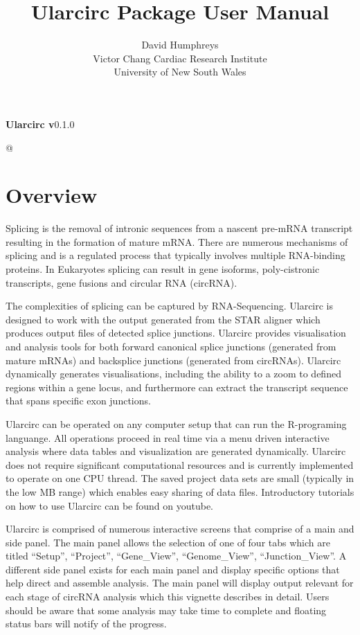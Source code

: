 \documentclass[12pt]{article}\usepackage[]{graphicx}\usepackage[]{color}
\title{Ularcirc Package User Manual}
\author{David Humphreys\\
Victor Chang Cardiac Research Institute\\
University of New South Wales
}
\begin{document}
\maketitle

\begin{center}
\textbf{Ularcirc v}0.1.0
\end{center}
@

\tableofcontents



\section{Overview} \label{sec:praeludium}

\indent Splicing is the removal of intronic sequences from a nascent pre-mRNA transcript resulting in the formation of mature mRNA. There are numerous mechanisms of splicing and is a regulated process that typically involves multiple RNA-binding proteins. In Eukaryotes splicing can result in gene isoforms, poly-cistronic transcripts, gene fusions and circular RNA (circRNA). \par
 The complexities of splicing  can be captured by RNA-Sequencing. Ularcirc is designed to work with the output generated from the STAR aligner which produces output files of detected splice junctions. Ularcirc provides visualisation and analysis tools for both forward canonical splice junctions (generated from mature mRNAs) and backsplice junctions (generated from circRNAs). Ularcirc dynamically generates visualisations, including the ability to a zoom to defined regions within a gene locus, and furthermore can extract the transcript sequence that spans specific exon junctions. \par
 Ularcirc can be operated on any computer setup that can run the R-programing languange. All operations proceed in real time via a menu driven interactive analysis where data tables and visualization are generated dynamically. Ularcirc does not require significant computational resources and is currently implemented to operate on one CPU thread. The saved project data sets are small (typically in the low MB range) which enables easy sharing of data files. Introductory tutorials on how to use Ularcirc can be found on youtube. \par
Ularcirc is comprised of numerous interactive screens that comprise of a main and side panel. The main panel allows the selection of one of four tabs which are titled ``Setup'', ``Project'', ``Gene\_View'', ``Genome\_View'', ``Junction\_View''. A different side panel exists for each main panel and display  specific options that help direct and assemble analysis. The main panel will display output relevant for each stage of circRNA analysis which this vignette describes in detail. Users should be aware that some analysis may take time to complete and floating status bars will notify of the progress.
\end{document}
